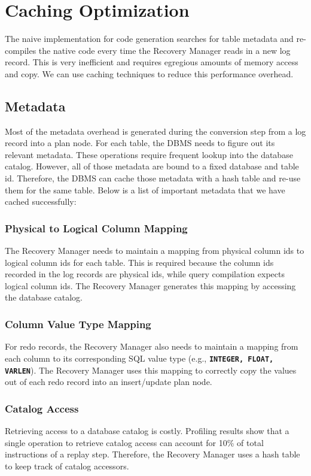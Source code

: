 \documentclass[12pt]{cmuthesis}
\newcommand{\dbSQL}[1]{\texttt{\textbf{#1}}\xspace}
\begin{document}
\section{Caching Optimization}
\label{caching_optimization}

The naive implementation for code generation searches for table metadata and re-compiles the native code every time the Recovery Manager reads in a new log record. This is very inefficient and requires egregious amounts of memory access and copy. We can use caching techniques to reduce this performance overhead.

\subsection{Metadata}
Most of the metadata overhead is generated during the conversion step from a log record into a plan node. For each table, the DBMS needs to figure out its relevant metadata. These operations require frequent lookup into the database catalog. However, all of those metadata are bound to a fixed database and table id. Therefore, the DBMS can cache those metadata with a hash table and re-use them for the same table. Below is a list of important metadata that we have cached successfully:

\subsubsection{Physical to Logical Column Mapping}
The Recovery Manager needs to maintain a mapping from physical column ids to logical column ids for each table. This is required because the column ids recorded in the log records are physical ids, while query compilation expects logical column ids. The Recovery Manager generates this mapping by accessing the database catalog.
\subsubsection{Column Value Type Mapping}
For redo records, the Recovery Manager also needs to maintain a mapping from each column to its corresponding SQL value type (e.g., \dbSQL{INTEGER, FLOAT, VARLEN}). The Recovery Manager uses this mapping to correctly copy the values out of each redo record into an insert/update plan node.
\subsubsection{Catalog Access}
Retrieving access to a database catalog is costly. Profiling results show that a single operation to retrieve catalog access can account for 10\% of total instructions of a replay step. Therefore, the Recovery Manager uses a hash table to keep track of catalog accessors.
\end{document}
